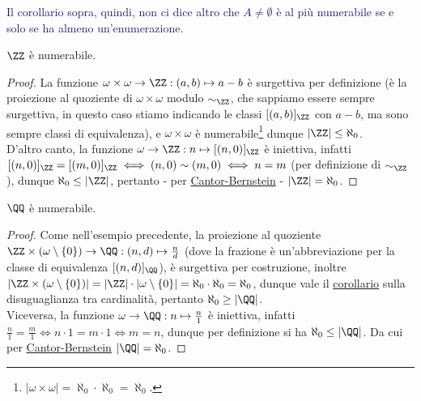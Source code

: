 \textcolor{MidnightBlue}{Il corollario sopra, quindi, non ci dice altro che $A \ne \emptyset$ è al più numerabile se e solo se ha almeno un'enumerazione.}

\begin{example}
	$\ZZ$ è numerabile.
\end{example}

\begin{proof}
	La funzione $\omega \times \omega \to \ZZ : (a,b) \mapsto a - b$ è surgettiva per definizione (è la proiezione al quoziente di $\omega \times \omega$ modulo $\sim_\ZZ$, che sappiamo essere sempre surgettiva, in questo caso stiamo indicando le classi $[(a,b)]_\ZZ$ con $a - b$, ma sono sempre classi di equivalenza), e $\omega \times \omega$ è numerabile\footnote{$|\omega \times \omega| = \aleph_0 \cdot \aleph_0 = \aleph_0$.} dunque $|\ZZ|\leq \aleph_0$.\\
	D'altro canto, la funzione $\omega \rightarrow \ZZ : n \mapsto [(n,0)]_\ZZ$ è iniettiva, infatti $[(n,0)]_\ZZ = [(m,0)]_\ZZ \iff (n,0) \sim (m,0) \iff n = m$ (per definizione di $\sim_\ZZ$), dunque $\aleph_0 \leq |\ZZ|$, pertanto - per \hyperref[CB]{Cantor-Bernstein} - $|\ZZ| = \aleph_0$.
\end{proof}

\begin{example}
	$\QQ$ è numerabile.
\end{example}

\begin{proof}
	Come nell'esempio precedente, la proiezione al quoziente $\ZZ \times (\omega \setminus\{0\}) \rightarrow \QQ : (n,d) \mapsto \frac{n}{d}$ (dove la frazione è un'abbreviazione per la classe di equivalenza $[(n,d)]_\QQ$), è surgettiva per costruzione, inoltre $|\ZZ \times (\omega \setminus\{0\})| = |\ZZ| \cdot |\omega \setminus\{0\}| = \aleph_0 \cdot \aleph_0 = \aleph_0$, dunque vale il 
	\hyperref[disugcardnum]{corollario} sulla disuguaglianza tra cardinalità, pertanto $\aleph_0 \geq |\QQ|$.\\
	Viceversa, la funzione $\omega \rightarrow \QQ : n \mapsto \frac{n}{1}$ è iniettiva, infatti $\frac n1 = \frac m1 \iff n \cdot 1 = m \cdot 1 \iff m = n$, dunque per definizione si ha $\aleph_0 \leq |\QQ|$. Da cui per \hyperref[CB]{Cantor-Bernstein} $|\QQ| = \aleph_0$.
\end{proof}


